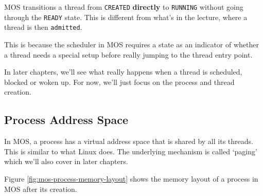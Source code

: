 \begin{note}
    \item MOS transitions a thread from \texttt{CREATED} \textbf{directly} to
    \texttt{RUNNING} without going through the \texttt{READY} state. This is different
    from what's in the lecture, where a thread is then \texttt{admitted}.

    This is because the scheduler in MOS requires a state as an indicator of whether a thread
    needs a special setup before really jumping to the thread entry point.
\end{note}

In later chapters, we'll see what really happens when a thread is scheduled, blocked
or woken up. For now, we'll just focus on the process and thread creation.

\subsection{Process Address Space}

In MOS, a process has a virtual address space that is shared by all its threads. This is
similar to what Linux does. The underlying mechanism is called `paging' which we'll
also cover in later chapters.

Figure \ref{fig:mos-process-memory-layout} shows the memory layout of a process in MOS
after its creation.

